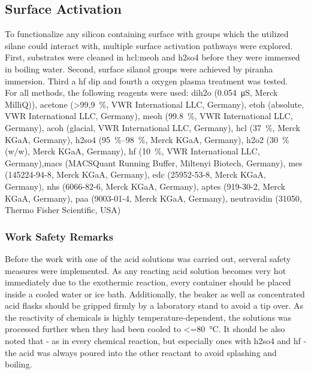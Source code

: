 \subsection{Surface Activation}
\label{sec:meth:surfActiv}
To functionalize any silicon containing surface with  groups which the utilized silane could interact with, multiple surface activation pathways were explored. First, substrates were cleaned in \gls{hcl}:\gls{meoh} and \gls{h2so4} before they were immersed in boiling water. Second, surface silanol groups were achieved by piranha immersion. Third a \gls{hf} dip and fourth a oxygen plasma treatment was tested.\\
For all methods, the following reagents were used: \gls{dih2o} (\SI{0,054}{\micro\siemens}, Merck MilliQ)), acetone (\SI{>99,9}{\percent}, VWR International LLC, Germany), \gls{etoh} (absolute, VWR International LLC, Germany), \gls{meoh} (\SI{99.8}{\percent}, VWR International LLC, Germany), \gls{acoh} (glacial,  VWR International LLC, Germany), \gls{hcl} (\SI{37}{\percent}, Merck KGaA, Germany), \gls{h2so4} (\SIrange{95}{98}{\percent}, Merck KGaA, Germany), \gls{h2o2} (\SI{30}{\percent} (w/w), Merck KGaA, Germany), \gls{hf} (\SI{10}{\percent},  VWR International LLC, Germany),\gls{macs} (MACSQuant Running Buffer, Miltenyi Biotech, Germany), \gls{mes} (145224-94-8, Merck KGaA, Germany), \gls{edc} (25952-53-8, Merck KGaA, Germany), \gls{nhs} (6066-82-6, Merck KGaA, Germany), \gls{aptes} (919-30-2, Merck KGaA, Germany), \gls{paa} (9003-01-4, Merck KGaA, Germany), neutravidin (31050, Thermo Fisher Scientific, USA)
\subsubsection{Work Safety Remarks}
Before the work with one of the acid solutions was carried out, serveral safety measures were implemented. As any reacting acid solution becomes very hot immediately due to the exothermic reaction, every container should be placed inside a cooled water or ice bath. Additionally, the beaker as well as concentrated acid flasks should be gripped firmly by a laboratory stand to avoid a tip over. As the reactivity of chemicals is highly temperature-dependent, the solutions was processed further when they had been cooled to \SI{<=80}{\degreeCelsius}. It should be also noted that - as in every chemical reaction, but especially ones with \gls{h2so4} and \gls{hf} - the acid was always poured into the other reactant to avoid splashing and boiling.
